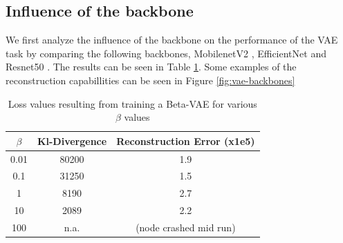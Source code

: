 \subsection{Influence of the backbone}
We first analyze the influence of the backbone on the performance of the VAE task by comparing the following backbones, MobilenetV2 \cite{sandler2019mobilenetv2invertedresidualslinear}, EfficientNet \cite{tan2020efficientnetrethinkingmodelscaling} and Resnet50 \cite{he2015deep}. The results can be seen in Table \ref{tab:vae-backbones}. Some examples of the reconstruction capabillities can be seen in Figure \ref{fig:vae-backbones}

\begin{table}[!ht]
    \centering
    \caption{Loss values resulting from training a Beta-VAE for various $\beta$ values}
    \label{tab:vae-backbones}
    \begin{tabular}{ccc}
        \hline
        $\beta$ & Kl-Divergence & Reconstruction Error (x1e5) \\
        \hline
        0.01    & 80200         & 1.9                         \\
        0.1     & 31250         & 1.5                         \\
        1       & 8190          & 2.7                         \\
        10      & 2089          & 2.2                         \\
        100     & n.a.          & (node crashed mid run)      \\
        \hline
    \end{tabular}
\end{table}

